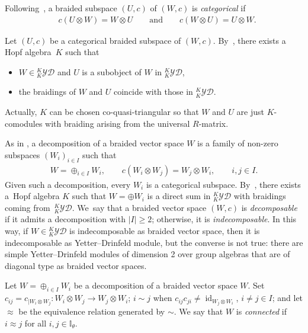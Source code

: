 \documentclass[pdftex]{sigma}
\numberwithin{equation}{section}
\newcommand{\id}{\operatorname{id}}
\newcommand{\I}{{\mathbb I}}
\newcommand{\yd}[1]{{}_{#1}^{#1}\mathcal{YD}}
\begin{document}
Following~\cite{T}, a braided subspace $(U,c)$ of $(W,c)$ is \emph{categorical} if
\begin{align*}%
&c(U \otimes W) = W \otimes U\qquad \text{and}\qquad c(W \otimes U) = U \otimes W.
\end{align*}

Let $(U,c)$ be a categorical braided subspace of $(W,c)$. By~\cite[Proposition~6.6]{T}, there
exists a Hopf al\-ge\-bra~$K$ such that
\begin{itemize}\itemsep=0pt
\item $W \in \yd{K}$ and $U$ is a subobject of $W$ in $\yd{K}$,
\item the braidings of $W$ and $U$ coincide with those in $\yd{K}$.
\end{itemize}
Actually, $K$ can be chosen co-quasi-triangular so that $W$ and $U$ are just $K$-comodules with braiding arising from the universal $R$-matrix.

As in \cite[Definition 2.1]{gr-jalg}, a decomposition of a braided vector space $W$ is a family of non-zero subspaces
$(W_i)_{i \in I}$ such that
\begin{align*}
W = \oplus_{i \in I} W_i,\qquad
c(W_i \otimes W_j) = W_j \otimes W_i,\qquad i,j\in I.
\end{align*}
Given such a decomposition, every $W_i$ is a categorical subspace. By~\cite[Proposition~6.6]{T}, there
exists a~Hopf algebra $K$ such that $W = \oplus W_i$ is a direct sum in $\yd{K}$ with braidings coming from~$\yd{K}$.
We~say that a braided vector space $(W,c)$ is \emph{decomposable} if it admits a decomposition
with $\vert I \vert \geq 2$; otherwise, it is \emph{indecomposable}.
In this way, if $W \in \yd{K}$ is indecomposable as braided vector space, then it is indecomposable as Yetter--Drinfeld module,
but the converse is not true: there are simple Yetter--Drinfeld modules of dimension 2 over group algebras
that are of diagonal type as braided vector spaces.

\begin{Definition}\label{def:connected}
Let $W = \oplus_{i \in I} W_i$ be a decomposition of a braided vector space $W$.
Set $c_{ij} = c_{\vert W_i \otimes W_j}\colon W_i \otimes W_j \to W_j \otimes W_i$;
$i \sim j$ when $c_{ij}c_{ji} \neq \id_{W_j \otimes W_i}$, $i \neq j \in I$; and
let $\approx$ be the equivalence relation generated by $\sim$. We say that $W$ is \emph{connected} if
$i \approx j$ for all $i, j \in \I_\theta$.
\end{Definition}
\end{document}
